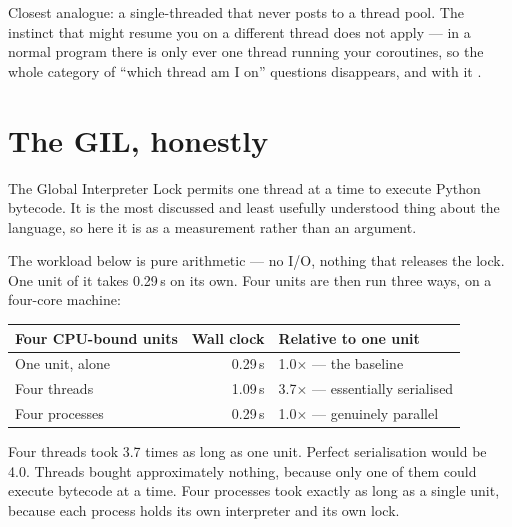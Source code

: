 
\begin{dotnetbox}
Closest analogue: a single-threaded  that never
posts to a thread pool. The instinct that  might resume you on a
different thread does not apply --- in a normal  program there is
only ever one thread running your coroutines, so the whole category of ``which
thread am I on'' questions disappears, and with it .
\end{dotnetbox}

\section{The GIL, honestly}
\label{sec:gil}

The Global Interpreter Lock permits one thread at a time to execute Python
bytecode. It is the most discussed and least usefully understood thing about the
language, so here it is as a measurement rather than an argument.

The workload below is pure arithmetic --- no I/O, nothing that releases the lock.
One unit of it takes 0.29\,s on its own. Four units are then run three ways, on a
four-core machine:

\begin{center}
\small
\begin{tabularx}{\linewidth}{@{}lrX@{}}
\toprule
\textbf{Four CPU-bound units} & \textbf{Wall clock} & \textbf{Relative to one unit} \\
\midrule
One unit, alone & 0.29\,s & 1.0$\times$ --- the baseline \\
Four threads & 1.09\,s & 3.7$\times$ --- essentially serialised \\
Four processes & 0.29\,s & 1.0$\times$ --- genuinely parallel \\
\bottomrule
\end{tabularx}
\end{center}

\noindent
Four threads took 3.7 times as long as one unit. Perfect serialisation would be
4.0. Threads bought approximately nothing, because only one of them could
execute bytecode at a time. Four processes took exactly as long as a single unit,
because each process holds its own interpreter and its own lock.

